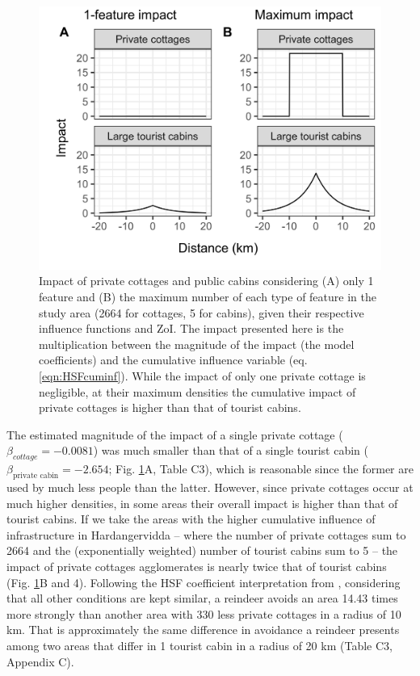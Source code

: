 \documentclass[titlepage]{article}
\begin{document}
\begin{figure}[h]
\centering
\includegraphics[width=1\textwidth,center]{figures/reindeer_zoi_impact_single_multiple_features.png}
\caption{\label{fig:impact_plot} Impact of private cottages and public cabins considering (A) only 1 feature and (B) the maximum number of each type of feature in the study area (2664 for cottages, 5 for cabins), given their respective influence functions and ZoI. The impact presented here is the multiplication between the magnitude of the impact (the model coefficients) and the cumulative influence variable (eq. \ref{eqn:HSFcuminf}). While the impact of only one private cottage is negligible, at their maximum densities the cumulative impact of private cottages is higher than that of tourist cabins.}
\end{figure}

The estimated magnitude of the impact of a single private
cottage ($\beta_{cottage} = -0.0081$) was much smaller than that of a single tourist cabin
($\beta_{\text{private cabin}} = -2.654$; Fig. \ref{fig:impact_plot}A, Table C3), which is reasonable since the former are used by much less people than the latter. However, since
private cottages occur at much higher densities, in some areas their overall impact 
is higher than that of tourist cabins. If we take the areas with the 
higher cumulative influence of infrastructure in Hardangervidda -- where the number of private cottages sum to 2664 
and the (exponentially weighted) number of tourist cabins sum to 5 -- the impact of 
private cottages agglomerates is nearly twice that of tourist cabins
 (Fig. \ref{fig:impact_plot}B and 4). Following the HSF coefficient interpretation from \citealp{fieberg_how_2021}, considering that all other conditions are kept similar, a reindeer avoids an area 14.43 times more strongly than another area with
330 less private cottages in a radius of 10 km. That is approximately the same difference in avoidance a reindeer presents among two areas 
that differ in 1 tourist cabin in a radius of 20 km (Table C3, Appendix C).
\end{document}
